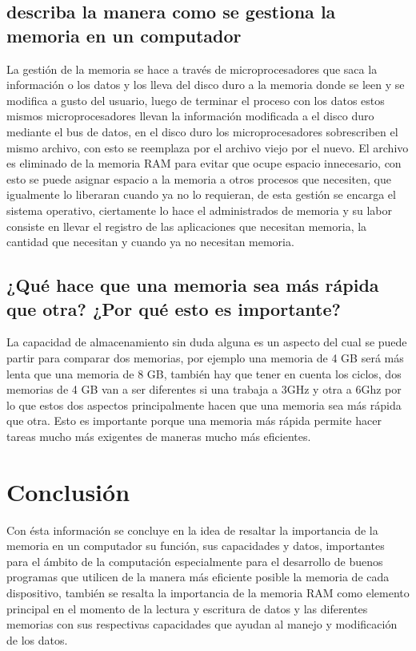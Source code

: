\documentclass{article}
\begin{document}
    \subsection{describa la manera como se gestiona la memoria en un computador}
    La gestión de la memoria se hace a través de microprocesadores que saca la información o los datos y los lleva del disco duro a la memoria donde se  leen y se modifica a gusto del usuario, luego de terminar el proceso con los datos estos mismos microprocesadores llevan la información modificada a el disco duro mediante el bus de datos, en el disco duro los microprocesadores sobrescriben el mismo archivo, con esto se reemplaza por el archivo viejo por el nuevo. 
    El archivo es eliminado de la memoria RAM para evitar que ocupe espacio innecesario, con esto se puede asignar espacio a la memoria a otros procesos que necesiten, que igualmente lo liberaran cuando ya no lo requieran, de esta gestión se encarga el sistema operativo, ciertamente lo hace el administrados de memoria y su labor consiste en llevar el registro de las aplicaciones que necesitan memoria, la cantidad que necesitan y cuando ya no necesitan memoria.
 
    
    
    \subsection{¿Qué hace que una memoria sea más rápida que otra? ¿Por qué esto es importante?}
    La capacidad de almacenamiento sin duda alguna es un aspecto del cual se puede partir para comparar dos memorias, por ejemplo una memoria de 4 GB será más lenta que una memoria de 8 GB, también hay que tener en cuenta los ciclos, dos memorias de 4 GB van a ser diferentes si una trabaja a 3GHz y otra a 6Ghz por lo que estos dos aspectos principalmente hacen que una memoria sea más rápida que otra. Esto es importante porque una memoria más rápida permite hacer tareas mucho más exigentes de maneras mucho más eficientes. 


\section{Conclusión} \label{conclulsion}
Con ésta información se concluye en la idea de resaltar la importancia de la memoria en un computador su función, sus capacidades y datos, importantes para el ámbito de la computación especialmente para el desarrollo de buenos programas que utilicen de la manera más eficiente posible la memoria de cada dispositivo, también se resalta la importancia de la memoria RAM como elemento principal en el momento de la lectura y escritura de datos y las diferentes memorias con sus respectivas capacidades que ayudan al manejo y modificación de los datos. 




\cite{rebollo}
\cite{Beekman}
\end{document}
